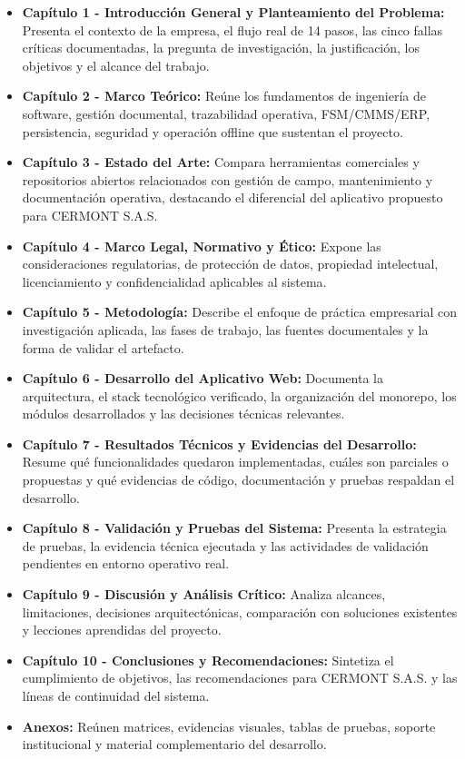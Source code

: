 \begin{itemize}
    \item \textbf{Capítulo 1 - Introducción General y Planteamiento del Problema:} Presenta el contexto de la empresa, el flujo real de 14 pasos, las cinco fallas críticas documentadas, la pregunta de investigación, la justificación, los objetivos y el alcance del trabajo.
    \item \textbf{Capítulo 2 - Marco Teórico:} Reúne los fundamentos de ingeniería de software, gestión documental, trazabilidad operativa, FSM/CMMS/ERP, persistencia, seguridad y operación offline que sustentan el proyecto.
    \item \textbf{Capítulo 3 - Estado del Arte:} Compara herramientas comerciales y repositorios abiertos relacionados con gestión de campo, mantenimiento y documentación operativa, destacando el diferencial del aplicativo propuesto para CERMONT S.A.S.
    \item \textbf{Capítulo 4 - Marco Legal, Normativo y Ético:} Expone las consideraciones regulatorias, de protección de datos, propiedad intelectual, licenciamiento y confidencialidad aplicables al sistema.
    \item \textbf{Capítulo 5 - Metodología:} Describe el enfoque de práctica empresarial con investigación aplicada, las fases de trabajo, las fuentes documentales y la forma de validar el artefacto.
    \item \textbf{Capítulo 6 - Desarrollo del Aplicativo Web:} Documenta la arquitectura, el stack tecnológico verificado, la organización del monorepo, los módulos desarrollados y las decisiones técnicas relevantes.
    \item \textbf{Capítulo 7 - Resultados Técnicos y Evidencias del Desarrollo:} Resume qué funcionalidades quedaron implementadas, cuáles son parciales o propuestas y qué evidencias de código, documentación y pruebas respaldan el desarrollo.
    \item \textbf{Capítulo 8 - Validación y Pruebas del Sistema:} Presenta la estrategia de pruebas, la evidencia técnica ejecutada y las actividades de validación pendientes en entorno operativo real.
    \item \textbf{Capítulo 9 - Discusión y Análisis Crítico:} Analiza alcances, limitaciones, decisiones arquitectónicas, comparación con soluciones existentes y lecciones aprendidas del proyecto.
    \item \textbf{Capítulo 10 - Conclusiones y Recomendaciones:} Sintetiza el cumplimiento de objetivos, las recomendaciones para CERMONT S.A.S. y las líneas de continuidad del sistema.
    \item \textbf{Anexos:} Reúnen matrices, evidencias visuales, tablas de pruebas, soporte institucional y material complementario del desarrollo.
\end{itemize}

